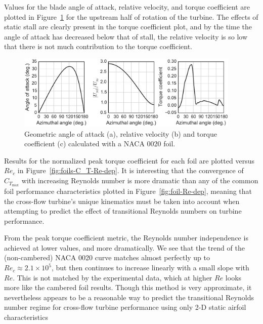 \documentclass[energies,article,accept,moreauthors,pdftex,12pt,a4paper]{mdpi}
\begin{document}
Values for the blade angle of attack, relative velocity, and torque coefficient
are plotted in Figure~\ref{fig:blade-kinematics} for the upstream half of 
rotation of the turbine. The effects of static stall
are clearly present in the torque coefficient plot, and by the time the angle of
attack has decreased below that of stall, the relative velocity is so low that
there is not much contribution to the torque coefficient.

\begin{figure}[ht!]
\centering
\includegraphics[width=0.95\textwidth]{figures/foil_kinematics_ct}
\caption{Geometric angle of attack (a), relative velocity (b) and torque coefficient
(c) calculated with a NACA 0020 foil.}
\label{fig:blade-kinematics}
\end{figure}

Results for the normalized peak torque coefficient for each foil are plotted 
versus $Re_c$
in Figure~\ref{fig:foils-C_T-Re-dep}. It is interesting that the convergence of
$C_{T_\mathrm{max}}$ with increasing Reynolds number is more dramatic than any of the
common foil performance characteristics plotted in 
Figure~\ref{fig:foil-Re-dep}, meaning
that the cross-flow turbine's unique kinematics must be taken into account when
attempting to predict the effect of transitional Reynolds numbers on turbine
performance. 

From the peak torque coefficient metric, the Reynolds number independence is
achieved at lower values, and more dramatically. We see that the trend of the
(non-cambered) NACA 0020 curve matches almost perfectly up to $Re_c \approx 2.1 
\times 10^5$, but then continues to
increase linearly with a small slope with $Re$. This is not matched by the 
experimental data, which at higher $Re$ looks more like the cambered foil 
results. Though this method is very
approximate, it nevertheless appears to be a reasonable way to predict the
transitional Reynolds number regime for cross-flow turbine performance using
only 2-D static airfoil characteristics
\end{document}
